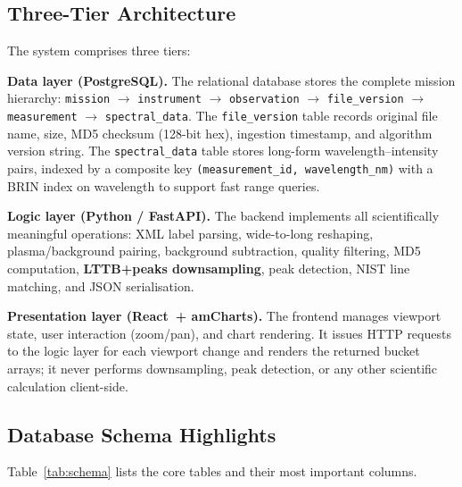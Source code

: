 \documentclass[a4paper,twocolumn,10pt]{article}
\begin{document}
\subsection{Three-Tier Architecture}

The system comprises three tiers:

\textbf{Data layer (PostgreSQL).}  The relational database stores the
complete mission hierarchy:
\texttt{mission} $\rightarrow$ \texttt{instrument} $\rightarrow$
\texttt{observation} $\rightarrow$ \texttt{file\_version} $\rightarrow$
\texttt{measurement} $\rightarrow$ \texttt{spectral\_data}.
The \texttt{file\_version} table records original file name, size,
MD5 checksum (128-bit hex), ingestion timestamp, and algorithm version
string.  The \texttt{spectral\_data} table stores long-form
wavelength--intensity pairs, indexed by a composite key
\texttt{(measurement\_id, wavelength\_nm)} with a BRIN index on
wavelength to support fast range queries.

\textbf{Logic layer (Python / FastAPI).}  The backend implements all
scientifically meaningful operations: XML label parsing, wide-to-long
reshaping, plasma/background pairing, background subtraction, quality
filtering, MD5 computation, \textbf{LTTB+peaks downsampling}, peak
detection, NIST line matching, and JSON serialisation.

\textbf{Presentation layer (React~+ amCharts).}  The frontend manages
viewport state, user interaction (zoom/pan), and chart rendering.
It issues HTTP requests to the logic layer for each viewport change and
renders the returned bucket arrays; it never performs downsampling,
peak detection, or any other scientific calculation client-side.

\subsection{Database Schema Highlights}

Table~\ref{tab:schema} lists the core tables and their most important
columns.
\end{document}
